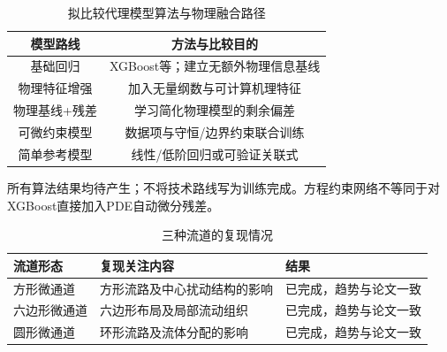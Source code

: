 \documentclass[UTF8]{midterm}
\begin{document}
\clearpage
\setcounter{section}{2}
\setcounter{figure}{8}
\clearpage
\setcounter{section}{2}
\setcounter{figure}{9}
\clearpage
\setcounter{section}{2}
\setcounter{table}{10}
\begin{table}[!htbp]
\centering\small
\caption{拟比较代理模型算法与物理融合路径}\label{tab:13}
\begin{tabularx}{\linewidth}{CC}
\toprule
{} 模型路线 & 方法与比较目的 \\
\midrule
基础回归 & XGBoost等；建立无额外物理信息基线 \\
物理特征增强 & 加入无量纲数与可计算机理特征 \\
物理基线+残差 & 学习简化物理模型的剩余偏差 \\
可微约束模型 & 数据项与守恒/边界约束联合训练 \\
简单参考模型 & 线性/低阶回归或可验证关联式 \\
\bottomrule
\end{tabularx}
\par\smallskip\begin{minipage}{\linewidth}\footnotesize 所有算法结果均待产生；不将技术路线写为训练完成。方程约束网络不等同于对XGBoost直接加入PDE自动微分残差。\end{minipage}
\end{table}
\clearpage
\setcounter{section}{2}
\setcounter{figure}{10}
\clearpage
\setcounter{section}{3}
\setcounter{table}{0}
\begin{table}[!htbp]
		\centering
		\caption{三种流道的复现情况}
		\label{m1:tab:repro}
		\begin{tabularx}{\textwidth}{@{}Y Y Y@{}}
			\toprule
{} 流道形态 & 复现关注内容 & 结果 \\
			\midrule
			方形微通道 & 方形流路及中心扰动结构的影响 & 已完成，趋势与论文一致 \\
			六边形微通道 & 六边形布局及局部流动组织 & 已完成，趋势与论文一致 \\
			圆形微通道 & 环形流路及流体分配的影响 & 已完成，趋势与论文一致 \\

			\bottomrule
		\end{tabularx}
	\end{table}
\end{document}
